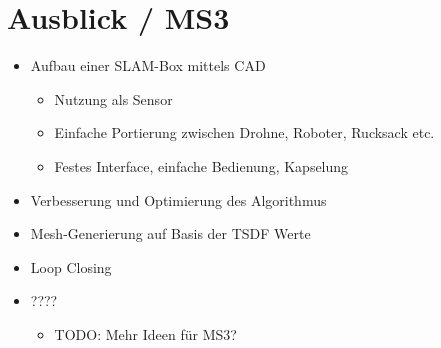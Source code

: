 \documentclass{beamer}
\begin{document}
\section{Ausblick / MS3}
\begin{frame}{\secname}
\begin{itemize}
\item{Aufbau einer SLAM-Box mittels CAD}
\begin{itemize}
\item{Nutzung als Sensor}
\item{Einfache Portierung zwischen Drohne, Roboter, Rucksack etc.}
\item{Festes Interface, einfache Bedienung, Kapselung}
\end{itemize}
\item{Verbesserung und Optimierung des Algorithmus}
\item{Mesh-Generierung auf Basis der TSDF Werte}
\item{Loop Closing}
\item{????}
\begin{itemize}
    \item{TODO: Mehr Ideen für MS3?}
\end{itemize}

\end{itemize}
\end{frame}
\end{document}
